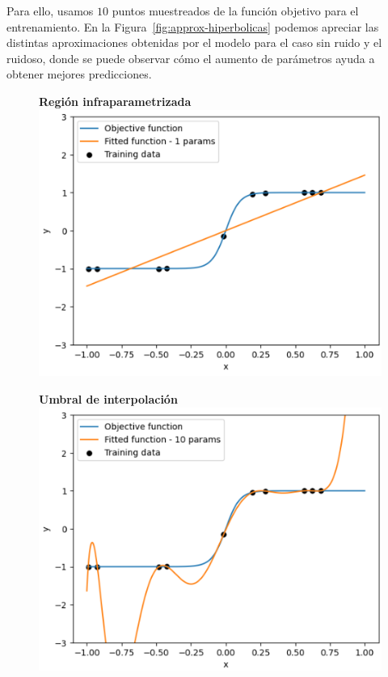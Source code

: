 Para ello, usamos $10$ puntos muestreados de la función objetivo para el entrenamiento. En la Figura~\ref{fig:approx-hiperbolicas} podemos apreciar las distintas aproximaciones obtenidas por el modelo para el caso sin ruido y el ruidoso, donde se puede observar cómo el aumento de parámetros ayuda a obtener mejores predicciones.\newline

\begin{figure}[h]
    \centering
    \begin{minipage}{0.32\textwidth}
        \centering
        \textbf{Región infraparametrizada} \\[0.5ex] 
        \includegraphics[width=\linewidth]{img/experiments/hiperbolica_noiseless1.1.png}
    \end{minipage}
    \begin{minipage}{0.32\textwidth}
        \centering
        \textbf{Umbral de interpolación} \\[0.5ex] 
        \includegraphics[width=\linewidth]{img/experiments/hiperbolica_noiseless1.2.png}

\end{minipage}
\end{figure}
